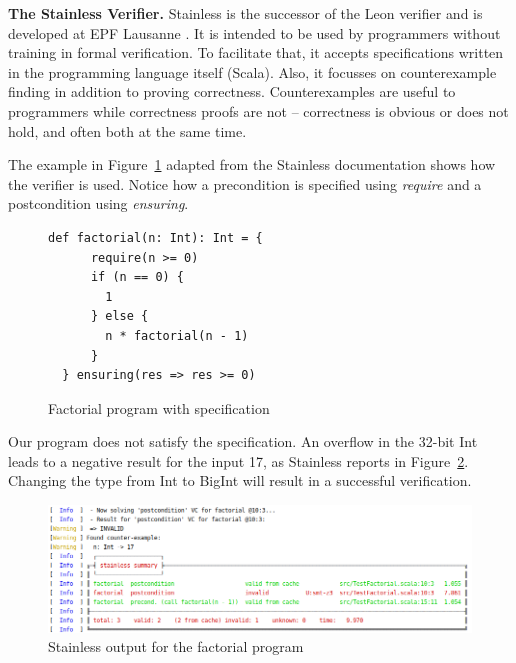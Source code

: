 \documentclass[runningheads]{llncs}
\renewcommand{\paragraph}{\textbf}%
\begin{document}
\paragraph{The Stainless Verifier.} Stainless is the successor of the
Leon verifier
\cite{DBLP:conf/ecoop/BlancKKS13,DBLP:conf/pldi/VoirolKK15,DBLP:conf/pldi/BlancK15}
and is developed at EPF Lausanne \cite{Stainless:github}. It is
intended to be used by programmers without training in formal
verification. To facilitate that, it accepts specifications written in
the programming language itself (Scala). Also, it focusses on
counterexample finding in addition to proving
correctness. Counterexamples are useful to programmers while
correctness proofs are not -- correctness is obvious or does not hold,
and often both at the same time.

The example in Figure~\ref{fig:factorial} adapted from the Stainless
documentation \cite{Stainless:documentation} shows how the verifier is
used. Notice how a precondition is specified using \emph{require} and
a postcondition using \emph{ensuring}.

\begin{figure}
\begin{lstlisting}[style=scala]
  def factorial(n: Int): Int = {
      require(n >= 0)
      if (n == 0) {
        1
      } else {
        n * factorial(n - 1)
      }
  } ensuring(res => res >= 0)
\end{lstlisting}
	\caption{Factorial program with specification}
	\label{fig:factorial}
\end{figure}
Our program does not satisfy the specification. An overflow in the
32-bit Int leads to a negative result for the input 17, as Stainless
reports in Figure~\ref{fig:failed}. Changing the type from Int to
BigInt will result in a successful verification.

\begin{figure}
	\centering
		\includegraphics[width=\textwidth]{output1.png}
	\caption{Stainless output for the factorial program}
	\label{fig:failed}
\end{figure}
\end{document}
